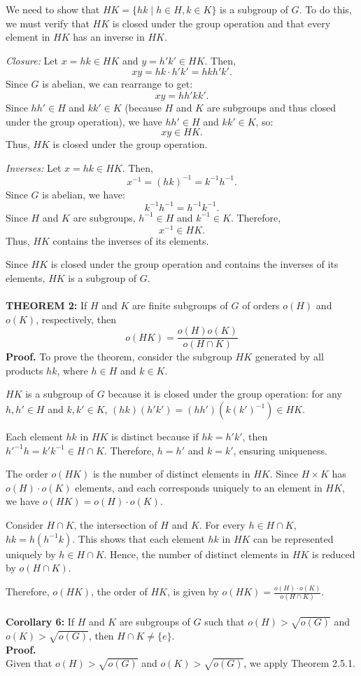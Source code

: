 We need to show that \( HK = \{ hk \mid h \in H, k \in K \} \) is a subgroup of \( G \). To do this, we must verify that \( HK \) is closed under the group operation and that every element in \( HK \) has an inverse in \( HK \).

\textit{Closure:} Let \( x = hk \in HK \) and \( y = h'k' \in HK \). Then,
\[
xy = hk \cdot h'k' = hkh'k'.
\]
Since \( G \) is abelian, we can rearrange to get:
\[
xy = hh'kk'.
\]
Since \( hh' \in H \) and \( kk' \in K \) (because \( H \) and \( K \) are subgroups and thus closed under the group operation), we have \( hh' \in H \) and \( kk' \in K \), so:
\[
xy \in HK.
\]
Thus, \( HK \) is closed under the group operation.

\textit{Inverses:} Let \( x = hk \in HK \). Then,
\[
x^{-1} = (hk)^{-1} = k^{-1}h^{-1}.
\]
Since \( G \) is abelian, we have:
\[
k^{-1}h^{-1} = h^{-1}k^{-1}.
\]
Since \( H \) and \( K \) are subgroups, \( h^{-1} \in H \) and \( k^{-1} \in K \). Therefore,
\[
x^{-1} \in HK.
\]
Thus, \( HK \) contains the inverses of its elements.

Since \( HK \) is closed under the group operation and contains the inverses of its elements, \( HK \) is a subgroup of \( G \).
\\\\
\textbf{THEOREM 2:} If $H$ and $K$ are finite subgroups of $G$ of orders $o(H)$ and $o(K)$, respectively, then 
\[ o(HK) = \frac{o(H) o(K)}{o(H \cap K)} \]
\textbf{Proof.}
To prove the theorem, consider the subgroup $HK$ generated by all products $hk$, where $h \in H$ and $k \in K$.

$HK$ is a subgroup of $G$ because it is closed under the group operation: for any $h, h' \in H$ and $k, k' \in K$, $(hk)(h'k') = (hh')(k(k')^{-1}) \in HK$.

Each element $hk$ in $HK$ is distinct because if $hk = h'k'$, then $h'^{-1}h = k'k^{-1} \in H \cap K$. Therefore, $h = h'$ and $k = k'$, ensuring uniqueness.

The order $o(HK)$ is the number of distinct elements in $HK$. Since $H \times K$ has $o(H) \cdot o(K)$ elements, and each corresponds uniquely to an element in $HK$, we have $o(HK) = o(H) \cdot o(K)$.

Consider $H \cap K$, the intersection of $H$ and $K$. For every $h \in H \cap K$, $hk = h(h^{-1}k)$. This shows that each element $hk$ in $HK$ can be represented uniquely by $h \in H \cap K$. Hence, the number of distinct elements in $HK$ is reduced by $o(H \cap K)$.

Therefore, $o(HK)$, the order of $HK$, is given by $o(HK) = \frac{o(H) \cdot o(K)}{o(H \cap K)}$.
\\\\
\textbf{Corollary 6:} If $H$ and $K$ are subgroups of $G$ such that $o(H) > \sqrt{o(G)}$ and $o(K) > \sqrt{o(G)}$, then $H \cap K \neq \{e\}$.
\\
\textbf{Proof.}
\\
Given that $o(H) > \sqrt{o(G)}$ and $o(K) > \sqrt{o(G)}$, we apply Theorem 2.5.1.

